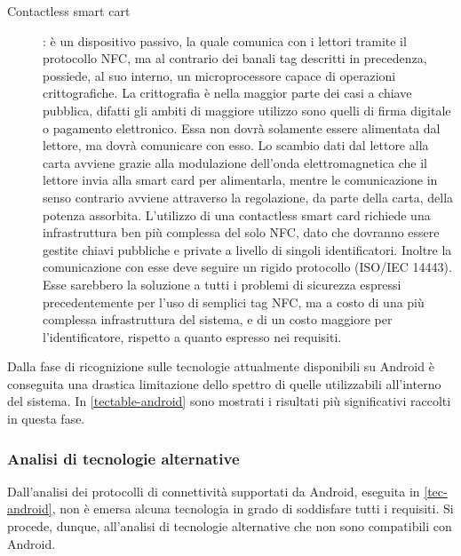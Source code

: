 \documentclass[a4paper,12pt]{report}
\begin{document}
\begin{description}
	\item[Contactless smart cart]: è un dispositivo passivo, la quale comunica con i lettori tramite il protocollo NFC, ma al contrario dei banali tag descritti in precedenza, possiede, al suo interno, un microprocessore capace di operazioni crittografiche. La crittografia è nella maggior parte dei casi a chiave pubblica, difatti gli ambiti di maggiore utilizzo sono quelli di firma digitale o pagamento elettronico. Essa non dovrà solamente essere alimentata dal lettore, ma dovrà comunicare con esso. Lo scambio dati dal lettore alla carta avviene grazie alla modulazione dell'onda elettromagnetica che il lettore invia alla smart card per alimentarla, mentre le comunicazione in senso contrario avviene attraverso la regolazione, da parte della carta, della potenza assorbita. L'utilizzo di una contactless smart card richiede una infrastruttura ben più complessa del solo NFC, dato che dovranno essere gestite chiavi pubbliche e private a livello di singoli identificatori. Inoltre la comunicazione con esse deve seguire un rigido protocollo (ISO/IEC 14443). Esse sarebbero la soluzione a tutti i problemi di sicurezza espressi precedentemente per l'uso di semplici tag NFC, ma a costo di una più complessa infrastruttura del sistema, e di un costo maggiore per l'identificatore, rispetto a quanto espresso nei requisiti. 
\end{description}

Dalla fase di ricognizione sulle tecnologie attualmente disponibili su Android è conseguita una drastica limitazione dello spettro di quelle utilizzabili all'interno del sistema. In \autoref{tectable-android} sono mostrati i risultati più significativi raccolti in questa fase.

\subsubsection{Analisi di tecnologie alternative} \label{tec-other}
Dall'analisi dei protocolli di connettività supportati da Android, eseguita in \autoref{tec-android}, non è emersa alcuna tecnologia in grado di soddisfare tutti i requisiti. Si procede, dunque, all'analisi di tecnologie alternative che non sono compatibili con Android.
\end{document}
